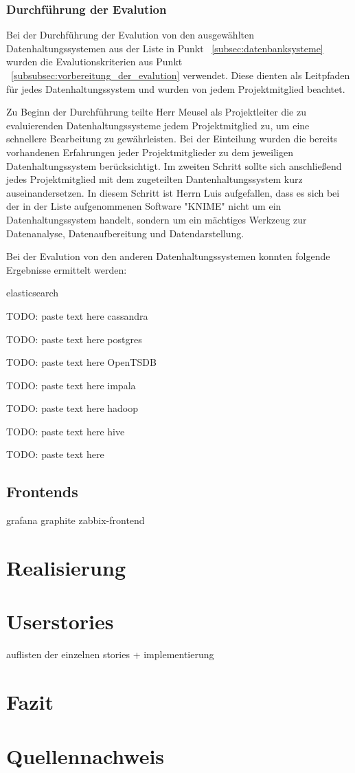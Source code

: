 \subsubsection{Durchführung der Evalution}
\label{subsubsec:durchfuehrung_der_evalution}
Bei der Durchführung der Evalution von den ausgewählten
Datenhaltungssystemen aus der Liste in Punkt ~\ref{subsec:datenbanksysteme}
wurden die Evalutionskriterien aus Punkt 
~\ref{subsubsec:vorbereitung_der_evalution} verwendet. Diese dienten
als Leitpfaden für jedes Datenhaltungssystem und wurden von jedem
Projektmitglied beachtet.

Zu Beginn der Durchführung teilte Herr Meusel als Projektleiter
die zu evaluierenden Datenhaltungssysteme jedem Projektmitglied zu,
um eine schnellere Bearbeitung zu gewährleisten. Bei der Einteilung
wurden die bereits vorhandenen Erfahrungen jeder Projektmitglieder zu
dem jeweiligen Datenhaltungssystem berücksichtigt. Im zweiten Schritt
sollte sich anschließend jedes Projektmitglied mit dem zugeteilten
Dantenhaltungssystem kurz auseinandersetzen. In diesem Schritt ist
Herrn Luis aufgefallen, dass es sich bei der in der Liste
aufgenommenen Software "KNIME" nicht um ein Datenhaltungssystem
handelt, sondern um ein mächtiges Werkzeug zur Datenanalyse,
Datenaufbereitung und Datendarstellung.

Bei der Evalution von den anderen Datenhaltungssystemen konnten
folgende Ergebnisse ermittelt werden: 
\begin{outline}
  \1 elasticsearch
  
  TODO: paste text here
  \1 cassandra
  
  TODO: paste text here
  \1 postgres
  
  TODO: paste text here
  \1 OpenTSDB
  
  TODO: paste text here
  \1 impala
  
  TODO: paste text here
  \1 hadoop
  
  TODO: paste text here
  \1 hive
  
  TODO: paste text here
\end{outline}
\nl%

\subsection{Frontends}

\begin{outline}
  \1 grafana
  \1 graphite
  \1 zabbix-frontend
\end{outline}

\section{Realisierung}

\section{Userstories}
auflisten der einzelnen stories + implementierung

\section{Fazit}

\section{Quellennachweis}
\printbibliography%
